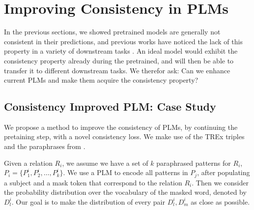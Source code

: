 \section{Improving Consistency in PLMs}
\label{sec:adding_consistency}

In the previous sections, we showed pretrained models are generally not consistent in their predictions, and previous works have noticed the lack of this property in a variety of downstream tasks \cite{}.
An ideal model would exhibit the consistency property already during the pretrained, and will then be able to transfer it to different downstream tasks. We therefor ask:
Can we enhance current PLMs and make them acquire the consistency property?

\subsection{Consistency Improved PLM: Case Study}
We propose a method to improve the consistency of PLMs, by continuing the pretaining step, with a novel consistency loss. %
We make use of the TREx triples and the paraphrases from \resource{}.

Given a relation $R_i$, we
assume we have a set of $k$ paraphrased patterns for $R_i$,
$P_i=\{P_1^i, P_2^i, \dots, P_k^i\}$.
We use a PLM to encode all patterns in $P_j$, after populating a subject and a mask token that correspond to the relation $R_i$. Then we consider the probability distribution over the vocabulary of the masked word, denoted by $D^i_l$. Our goal is to make the distribution of every pair $D^i_l,D^i_m$ as close as possible.


